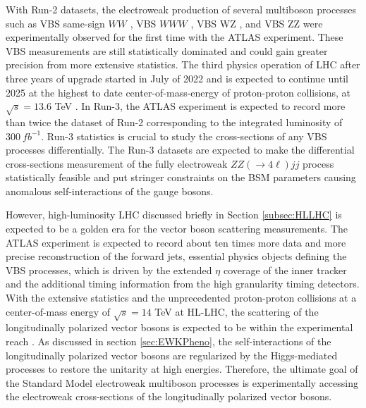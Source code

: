 With Run-2 datasets, the electroweak production of several multiboson processes such as VBS same-sign $WW$ \cite{EWk_ssWW}, VBS $WWW$ \cite{EWK_WWW}, VBS WZ \cite{EWK_WZ}, and VBS ZZ \cite{ATLASZZjj} were experimentally observed for the first time with the ATLAS experiment. These VBS measurements are still statistically dominated and could gain greater precision from more extensive statistics. The third physics operation of LHC after three years of upgrade started in July of 2022 and is expected to continue until 2025 at the highest to date center-of-mass-energy of proton-proton collisions, at $\sqrt{s}=13.6$ TeV \cite{Run3}. In Run-3, the ATLAS experiment is expected to record more than twice the dataset of Run-2 corresponding to the integrated luminosity of $300 ~fb^{-1}$. Run-3 statistics is crucial to study the cross-sections of any VBS processes differentially. The Run-3 datasets are expected to make the differential cross-sections measurement of the fully electroweak $ZZ(\rightarrow 4\ell) jj$ process statistically feasible and put stringer constraints on the BSM parameters causing anomalous self-interactions of the gauge bosons. 

However, high-luminosity LHC discussed briefly in Section \ref{subsec:HLLHC} is expected to be a golden era for the vector boson scattering measurements. The ATLAS experiment is expected to record about ten times more data and more precise reconstruction of the forward jets, essential physics objects defining the VBS processes, which is driven by the extended $\eta$ coverage of the inner tracker and the additional timing information from the high granularity timing detectors. With the extensive statistics and the unprecedented proton-proton collisions at a center-of-mass energy of $\sqrt{s}=14$ TeV at HL-LHC, the scattering of the longitudinally polarized vector bosons is expected to be within the experimental reach \cite{ssWW_HLLHCProspects}. As discussed in section \ref{sec:EWKPheno}, the self-interactions of the longitudinally polarized vector bosons are regularized by the Higgs-mediated processes to restore the unitarity at high energies. Therefore, the ultimate goal of the Standard Model electroweak multiboson processes is experimentally accessing the electroweak cross-sections of the longitudinally polarized vector bosons.